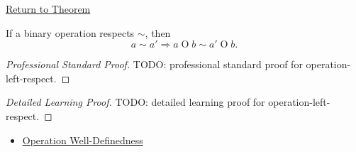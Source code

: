 \newpage
{}
\label{prf:operation-left-respect}

\begin{remark*}[Return]
\hyperref[lem:operation-left-respect]{Return to Theorem}
\end{remark*}

\begin{lemma*}
If a binary operation respects $\sim$, then
\[
a\sim a' \Longrightarrow a\mathbin{O}b\sim a'\mathbin{O}b.
\]
\end{lemma*}

\begin{proof}[Professional Standard Proof]
\LRAProofBodyStart
TODO: professional standard proof for operation-left-respect.
\end{proof}

\begin{proof}[Detailed Learning Proof]
\LRAProofBodyStart
TODO: detailed learning proof for operation-left-respect.
\end{proof}

\begin{remark*}
\end{remark*}

\begin{dependencies}
\begin{itemize}
  \item \hyperref[def:operation-well-definedness]{Operation Well-Definedness}
\end{itemize}
\end{dependencies}

\clearpage
